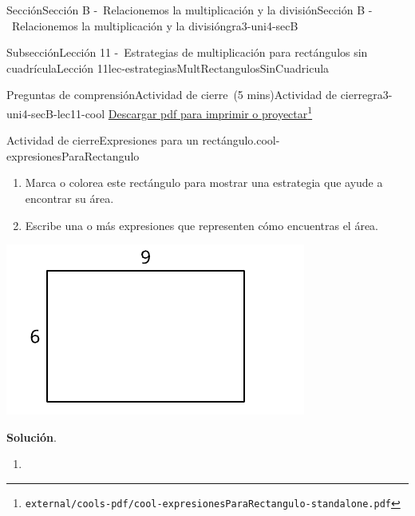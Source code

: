 \documentclass[oneside,10pt,]{article}
\newcommand{\blocktitlefont}{\relax}
\begin{document}
\begin{sectionptx}{Sección}{Sección B -~Relacionemos la multiplicación y la división}{}{Sección B -~Relacionemos la multiplicación y la división}{}{}{gra3-uni4-secB}
\begin{subsectionptx}{Subsección}{Lección 11 -~Estrategias de multiplicación para rectángulos sin cuadrícula}{}{Lección 11}{}{}{lec-estrategiasMultRectangulosSinCuadricula}
%
%
\typeout{************************************************}
\typeout{************************************************}
%
\begin{reading-questions-subsubsection}{Preguntas de comprensión}{Actividad de cierre~(5 mins)}{}{Actividad de cierre}{}{}{gra3-uni4-secB-lec11-cool}
\href{external/cools-pdf/cool-expresionesParaRectangulo-standalone.pdf}{Descargar pdf para imprimir o proyectar}\footnote{\nolinkurl{external/cools-pdf/cool-expresionesParaRectangulo-standalone.pdf}\label{gra3-uni4-secB-lec11-cool-5}}\begin{project}{Actividad de cierre}{Expresiones para un rectángulo.}{cool-expresionesParaRectangulo}%
\begin{sidebyside}{2}{0}{0}{0}%
\begin{sbspanel}{0.6}%
%
\begin{enumerate}[label={(\alph*)}]
\item{}Marca o colorea este rectángulo para mostrar una estrategia que ayude a encontrar su área.%
\item{}Escribe una o más expresiones que representen cómo encuentras el área.%
\end{enumerate}
\end{sbspanel}%
\begin{sbspanel}{0.4}%
\includegraphics[width=\linewidth]{external/svg-source/tikz-file-158678-scale13.pdf}
\end{sbspanel}%
\end{sidebyside}%
\par\smallskip%
\noindent\textbf{\blocktitlefont Solución}.\hypertarget{cool-expresionesParaRectangulo-3}{}\quad{}%
\begin{enumerate}[label={(\alph*)}]
\item{}\begin{sidebyside}{2}{0}{0}{0}%

\end{sidebyside}
\end{enumerate}
\end{project}
\end{reading-questions-subsubsection}
\end{subsectionptx}
\end{sectionptx}
\end{document}
